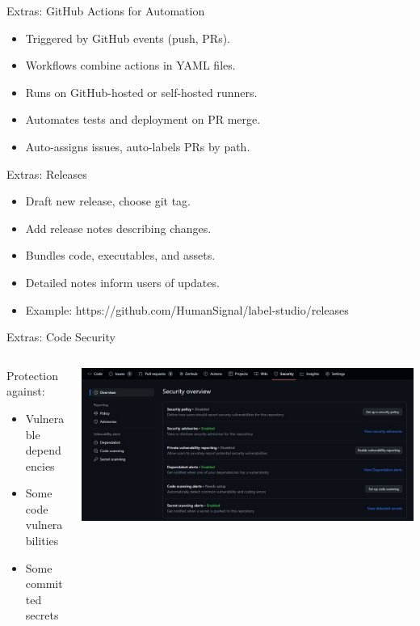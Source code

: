 \documentclass[aspectratio=169]{beamer}
\begin{document}
\begin{frame}{Extras: GitHub Actions for Automation}
    \begin{itemize}
        \item Triggered by GitHub events (push, PRs).
        \item Workflows combine actions in YAML files.
        \item Runs on GitHub-hosted or self-hosted runners.
        \item Automates tests and deployment on PR merge.
        \item Auto-assigns issues, auto-labels PRs by path.
    \end{itemize}
\end{frame}
\begin{frame}{Extras: Releases}
    \begin{itemize}
        \item Draft new release, choose git tag.
        \item Add release notes describing changes.
        \item Bundles code, executables, and assets.
        \item Detailed notes inform users of updates.
        \item Example: https://github.com/HumanSignal/label-studio/releases
    \end{itemize}
\end{frame}
\begin{frame}{Extras: Code Security}
    \begin{columns}
        \begin{column}{0.4\textwidth}
            Protection against:
            \begin{itemize}
                \item Vulnerable dependencies
                \item Some code vulnerabilities
                \item Some committed secrets
            \end{itemize}
        \end{column}
        \begin{column}{0.6\textwidth}
            \includegraphics[width=\textwidth,height=0.8\textheight,keepaspectratio]{github_security.jpg}
        \end{column}
    \end{columns}
\end{frame}
\end{document}
